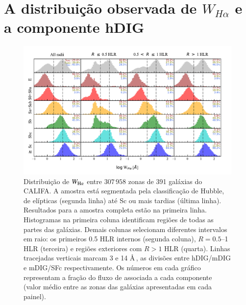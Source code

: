 

\section{A distribuição observada de $W_{H\alpha}$ e a componente hDIG}
\label{sec:DIGclass:WHaDistrib_hDIG}

\begin{figure}
\includegraphics[scale=0.9]{figuras/fig_WHa_histograms_per_morftype_and_radius_cumulFHa.pdf}
\caption[Histogramas de $W_{{\rm H}\alpha}$]
{Distribuição de $W_{\Ha}$ entre $307\,958$ zonas de 391 galáxias do CALIFA. A amostra está segmentada pela classificação de Hubble, de elípticas (segunda linha) até Sc ou mais tardias (última linha). Resultados para a amostra completa estão na primeira linha. Histogramas na primeira coluna identificam regiões de todas as partes das galáxias. Demais colunas selecionam diferentes intervalos em raio: os primeiros 0.5 HLR internos (segunda coluna), $R = 0.5$--1 HLR (terceira) e regiões exteriores com $R > 1$ HLR (quarta). Linhas tracejadas verticais marcam 3 e 14 \AA\,, as divisões entre hDIG/mDIG e mDIG/SFc respectivamente. Os números em cada gráfico representam a fração do fluxo de \Ha associada a cada componente (valor médio entre as zonas das galáxias apresentadas em cada painel).}
 \label{fig:WHaDistrib_ALLgals}
\end{figure}

